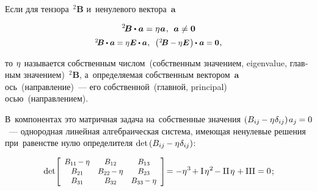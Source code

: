 \begin{otherlanguage}{russian}

Если для тензора~${^2\!\bm{B}}$ и~ненулевого вектора~${\bm{a}}$

\nopagebreak\vspace{-0.2em}\begin{equation}\label{eigenvalues:eq}
^2\!\bm{B} \dotp \bm{a} = \eigenvalue \bm{a} \hspace{.1ex} ,
\:\:
\bm{a} \neq \bm{0}
\end{equation}
\vspace{-1.2em}\[
\scalebox{0.92}[0.92]{${^2\!\bm{B}} \dotp \bm{a} = \eigenvalue \bm{E} \dotp \bm{a} \hspace{0.1ex},\;\;
\left(\hspace{0.1ex}
{^2\!\bm{B} - \eigenvalue \bm{E}}
\hspace{0.2ex}\right) \hspace{-0.1ex} \dotp \hspace{.1ex} \bm{a} = \bm{0}$} \hspace{.1ex},
\]

\vspace{-0.64em} \noindent то $\eta\hspace{.1ex}$ называется собственным числом~(собственным значением, eigenvalue, главным значением)~${^2\!\bm{B}}$, а~определяемая собственным вектором~$\bm{a}$ ось~(направление)~--- его собственной~(главной, principal) осью~(направлением).

В~компонентах это матричная задача на~собственные значения ${( B_{ij} \hspace{-0.12ex} - \eta\hspace{.1ex} \delta_{ij} ) \hspace{.25ex} a_j \hspace{-0.1ex} = 0}$~--- однородная линейная алгебраическая система, имеющая ненулевые решения при~равенстве нулю определителя ${\operatorname{det}\hspace{.32ex} ( B_{ij} \hspace{-0.12ex} - \eta\hspace{.1ex} \delta_{ij} )}$:

\nopagebreak\vspace{-0.1em}\begin{equation}\label{chardetequation}
\operatorname{det}\! \scalebox{0.9}[0.92]{$\left[
\begin{array}{ccc}
B_{11} \hspace{-0.16ex} - \eigenvalue & B_{12} & B_{13} \\
B_{21} & B_{22} \hspace{-0.16ex} - \eigenvalue & B_{23} \\
B_{31} & B_{32} & B_{33} \hspace{-0.16ex} - \eigenvalue
\end{array}
\right]$} \!= - \eigenvalue^3 \hspace{-0.25ex} + \mathrm{I}\hspace{.25ex} \eigenvalue^2 \hspace{-0.25ex} - \mathrm{II}\hspace{.25ex} \eigenvalue + \mathrm{III} = 0 \hspace{.2ex} ;
\end{equation}


\end{otherlanguage}
